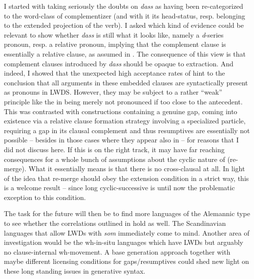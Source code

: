 \documentclass[output=paper]{langsci/langscibook}
\begin{document}
I started with taking seriously the doubts on \emph{dass} as having been
re-categorized to the word-class of
complementizer (and with it its head-status, resp.
belonging to the extended projection of the verb). I asked which kind of
evidence could be relevant to show whether \emph{dass} is still what it looks
like, namely a \emph{d}-series pronoun, resp. a relative pronoun, implying that
the complement clause is essentially a relative clause, as
assumed in \citet{Kayne2014}. The consequence of this view is that complement
clauses introduced by \emph{dass} should be opaque to extraction. And indeed, I
showed that the unexpected high acceptance rates of 
hint to the conclusion that all arguments in these embedded clauses are
syntactically present as pronouns in LWDS. However, they may be subject to a
rather \enquote{weak} principle like the  in being merely not
pronounced if too close to the antecedent. This was contrasted with
constructions containing a genuine gap, coming into existence via a relative
clause formation strategy involving a specialized
particle, requiring a gap in its clausal complement and thus
resumptives are
essentially not possible – besides in those cases where they appear also in
 – for reasons that I did not discuss here.  If this is
on the right track, it may have far reaching consequences for a whole bunch of
assumptions about the cyclic nature of  (re-merge). What it essentially
means is that there is no cross-clausal  at all. In light of the idea
that re-merge should obey the extension condition in a strict way, this is a
welcome result – since long cyclic-successive  is until now the
problematic exception to this condition.

The task for the future will then be to find more languages of the Alemannic
type to see whether the correlations outlined in  hold as
well. The Scandinavian languages that allow \glspl{LWD} with \emph{som}
immediately come to mind. Another area of investigation would be the wh-in-situ
languages which have \glspl{LWD} but arguably no clause-internal wh-movement. A
base generation approach together with maybe different licensing conditions for
gaps/resumptives could shed new light on these long
standing issues in generative syntax.



\printchapterglossary{}

{\sloppy
\printbibliography[heading=subbibliography,notkeyword=this]
}
\end{document}
